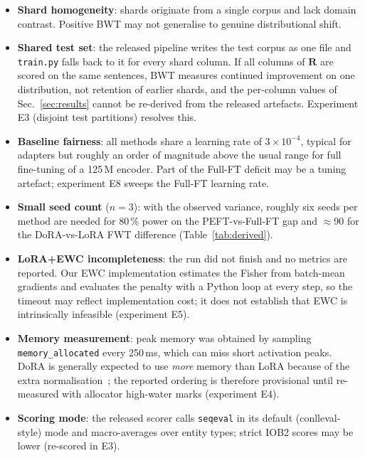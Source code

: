 \documentclass[11pt,a4paper]{article}
\begin{document}
\begin{itemize}
  \item \textbf{Shard homogeneity}: shards originate from a single
        corpus and lack domain contrast.  Positive BWT may not
        generalise to genuine distributional shift.
  \item \textbf{Shared test set}: the released pipeline writes the
        test corpus as one file and \texttt{train.py} falls back to it
        for every shard column.  If all columns of $\mathbf{R}$ are
        scored on the same sentences, BWT measures continued
        improvement on one distribution, not retention of earlier
        shards, and the per-column values of
        Sec.~\ref{sec:results} cannot be re-derived from the released
        artefacts.  Experiment E3 (disjoint test partitions) resolves
        this.
  \item \textbf{Baseline fairness}: all methods share a learning
        rate of $3\times10^{-4}$, typical for adapters but roughly an
        order of magnitude above the usual range for full fine-tuning
        of a 125\,M encoder.  Part of the Full-FT deficit may be a
        tuning artefact; experiment E8 sweeps the Full-FT learning
        rate.
  \item \textbf{Small seed count} ($n=3$): with the observed
        variance, roughly six seeds per method are needed for 80\,\%
        power on the PEFT-vs-Full-FT gap and $\approx$90 for the
        DoRA-vs-LoRA FWT difference (Table~\ref{tab:derived}).
  \item \textbf{LoRA+EWC incompleteness}: the run did not finish and
        no metrics are reported.  Our EWC implementation estimates the
        Fisher from batch-mean gradients and evaluates the penalty with
        a Python loop at every step, so the timeout may reflect
        implementation cost; it does not establish that EWC is
        intrinsically infeasible (experiment E5).
  \item \textbf{Memory measurement}: peak memory was obtained by
        sampling \texttt{memory\_allocated} every 250\,ms, which can
        miss short activation peaks.  DoRA is generally expected to
        use \emph{more} memory than LoRA because of the extra
        normalisation~\cite{Liu2024DoRA}; the reported ordering is
        therefore provisional until re-measured with allocator
        high-water marks (experiment E4).
  \item \textbf{Scoring mode}: the released scorer calls
        \texttt{seqeval} in its default (conlleval-style) mode and
        macro-averages over entity types; strict IOB2 scores may be
        lower (re-scored in E3).
\end{itemize}
\end{document}

